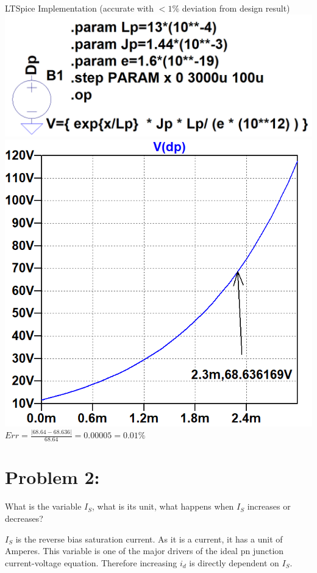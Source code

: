 \documentclass[12pt,letterpaper,titlepage]{article}
\begin{document}
\begin{raggedright}
\begin{center}
LTSpice Implementation (accurate with $< 1\%$ deviation from design result)
\includegraphics[width=.4\textwidth, height=\textheight, keepaspectratio=true]{ds2b}
\includegraphics[width=.4\textwidth, height=\textheight, keepaspectratio=true]{ds2c}
$Err = \frac{|68.64-68.636|}{68.64} = 0.00005 = 0.01\%$
\end{center}
\clearpage

\section{Problem 2: } What is the variable $I_S$, what is its unit, what happens when $I_S$ increases or decreases?

$I_S$ is the reverse bias saturation current. As it is a current, it has a unit of Amperes. This variable is one of the major drivers of the ideal pn junction current-voltage equation. Therefore increasing $i_d$ is directly dependent on $I_S$.

\end{raggedright}
\end{document}

